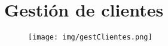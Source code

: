 \section{Gestión de clientes}
\begin{figure}[!h]
  \centering
    \texttt{[image: img/gestClientes.png]}
    \caption{}
\end{figure}